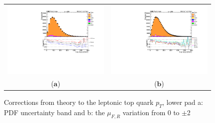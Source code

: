 \begin{figure}[htp]
\centering
\begin{tabular}{cc}
\hspace{-0.5cm}
\includegraphics[scale=0.45]{fig/chapt7/correction/lep_topPT_pdf.pdf}
& \hspace{-1.50cm} \includegraphics[scale=0.45]{fig/chapt7/correction/lep_top_ren_fac.pdf}\\
  \qquad ($\mathbf{a}$)\qquad\qquad&($\mathbf{b}$)\qquad\qquad\qquad\qquad \\
\end{tabular}
\caption{Corrections from theory to the leptonic top quark $p_{T}$, lower pad a: PDF uncertainty band and b: the $\mu_{F,R}$ variation from 0 to $\pm$2}\label{fig:top_pt_correc_expec}
\end{figure}  


